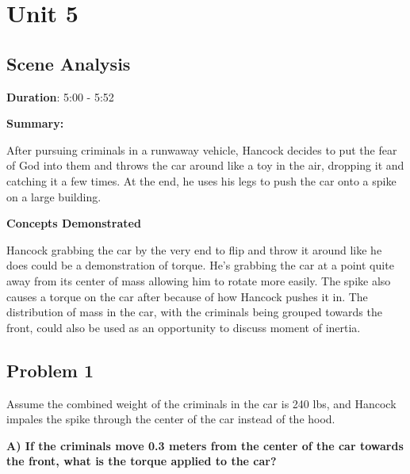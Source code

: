 \documentclass[a4paper,12pt]{article}
\begin{document}
\newpage

\section{Unit 5}

\vspace{-0.5cm}
\singlespacing

\subsection{Scene Analysis}

\textbf{Duration}: 5:00 - 5:52

\vspace{0.3cm}
\noindent\textbf{Summary:} \par
After pursuing criminals in a runwaway vehicle, Hancock decides to put the fear of God into them and throws the car around like a toy in the air, dropping it and catching it a few times. At the end, he uses his legs to push the car onto a spike on a large building. 
\par


\vspace{0.3cm}
\noindent\textbf{Concepts Demonstrated} \par
Hancock grabbing the car by the very end to flip and throw it around like he does could be a demonstration of torque. He's grabbing the car at a point quite away from its center of mass allowing him to rotate more easily. The spike also causes a torque on the car after because of how Hancock pushes it in. The distribution of mass in the car, with the criminals being grouped towards the front, could also be used as an opportunity to discuss moment of inertia. 

\subsection{Problem 1}
Assume the combined weight of the criminals in the car is 240 lbs, and Hancock impales the spike through the center of the car instead of the hood.

\noindent\textbf{A) If the criminals move 0.3 meters from the center of the car towards the front, what is the torque applied to the car? } \\
\end{document}
